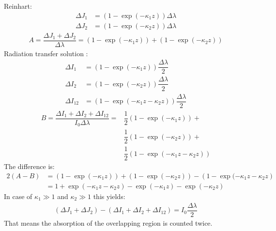 Reinhart:
\begin{align}
	\Delta J_1 &= \left(1 - \exp( - \kappa_1 z)\right) \Delta \lambda \\
	\Delta J_2 &= \left(1 - \exp( - \kappa_2 z)\right) \Delta \lambda 
\end{align}
\begin{align}
	A = \dfrac{\Delta J_1 + \Delta J_2}{\Delta \lambda} = \left(1 - \exp( - \kappa_1 z)\right) + \left(1 - \exp( - \kappa_2 z)\right)
\end{align}
Radiation transfer solution :
\begin{align}
	\Delta I_1 &= \left(1 - \exp( - \kappa_1 z)\right) \dfrac{\Delta \lambda}{2} \\
	\Delta I_2 &=  \left(1 - \exp( - \kappa_2 z)\right) \dfrac{\Delta \lambda}{2} \\
	\Delta I_{12} &= \left(1 - \exp( - \kappa_1 z - \kappa_2 z)\right) \dfrac{\Delta \lambda}{2}
\end{align}
\begin{align}
	B = \dfrac{\Delta I_1 + \Delta I_2 + \Delta I_{12}}{I_0 \Delta \lambda} =
			& \dfrac{1}{2} \left(1 - \exp( - \kappa_1 z)\right) +  \\
			& \dfrac{1}{2} \left(1 - \exp( - \kappa_2 z)\right) + \\ 
			& \dfrac{1}{2} \left(1 - \exp( - \kappa_1 z - \kappa_2 z)\right) 
\end{align}
The difference is:
\begin{align}
	2(A - B) &= \left(1 - \exp( - \kappa_1 z)\right) + \left(1 - \exp( - \kappa_2 z)\right) -
	\left(1 - \exp( - \kappa_1 z - \kappa_2 z\right) \\
	         &= 1  + \exp(- \kappa_1 z - \kappa_2 z) - \exp( - \kappa_1 z) - \exp( - \kappa_2 z)
\end{align}
In case of $\kappa_1 \gg 1$ and $\kappa_2 \gg 1$ this yields: 
\begin{align}
	(\Delta J_1 + \Delta J_2) - (\Delta I_1 + \Delta I_2 + \Delta I_{12})=
	I_0 \dfrac{\Delta \lambda}{2}
\end{align}
That means the absorption of the overlapping region is counted twice.